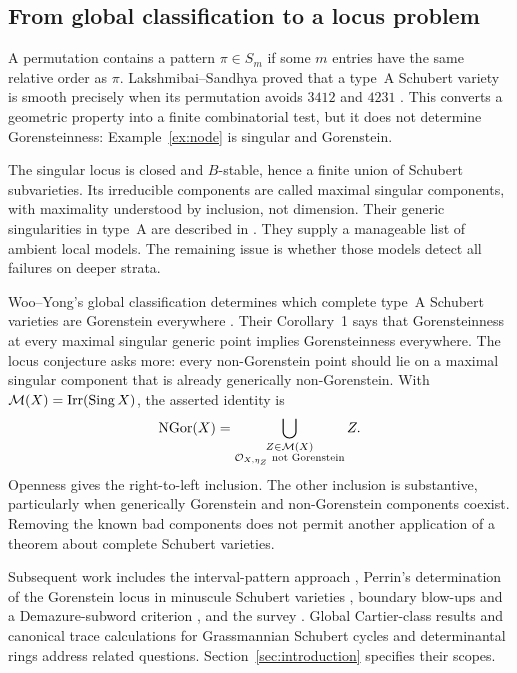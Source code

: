 \subsection{From global classification to a locus problem}
A permutation contains a pattern $\pi\in S_m$ if some $m$ entries have the same relative order as $\pi$. Lakshmibai--Sandhya proved that a type~A Schubert variety is smooth precisely when its permutation avoids $3412$ and $4231$ \cite{LS90}\cite[Theorem~7.6]{WY23}. This converts a geometric property into a finite combinatorial test, but it does not determine Gorensteinness: Example~\ref{ex:node} is singular and Gorenstein.

The singular locus is closed and $B$-stable, hence a finite union of Schubert subvarieties. Its irreducible components are called maximal singular components, with maximality understood by inclusion, not dimension. Their generic singularities in type~A are described in \cite{BW03,Cor03,KLR03,Man01b,Man01a}. They supply a manageable list of ambient local models. The remaining issue is whether those models detect all failures on deeper strata.

Woo--Yong's global classification determines which complete type~A Schubert varieties are Gorenstein everywhere \cite{WY06}. Their Corollary~1 says that Gorensteinness at every maximal singular generic point implies Gorensteinness everywhere. The locus conjecture asks more: every non-Gorenstein point should lie on a maximal singular component that is already generically non-Gorenstein. With $\mathcal M(X)=\operatorname{Irr}(\operatorname{Sing} X)$, the asserted identity is
\begin{equation}\label{eq:survey-wy}
 \operatorname{NGor}(X)=\bigcup_{\substack{Z\in\mathcal M(X)\\\mathcal O_{X,\eta_Z}\text{ not Gorenstein}}}Z.
\end{equation}
Openness gives the right-to-left inclusion. The other inclusion is substantive, particularly when generically Gorenstein and non-Gorenstein components coexist. Removing the known bad components does not permit another application of a theorem about complete Schubert varieties.

Subsequent work includes the interval-pattern approach \cite{WY08}, Perrin's determination of the Gorenstein locus in minuscule Schubert varieties \cite[Theorem~0.3 and Corollary~0.4]{Per09}, boundary blow-ups and a Demazure-subword criterion \cite{DS19}, and the survey \cite{WY23}. Global Cartier-class results \cite{LRY25} and canonical trace calculations for Grassmannian Schubert cycles and determinantal rings \cite{Kim26} address related questions. Section~\ref{sec:introduction} specifies their scopes.

